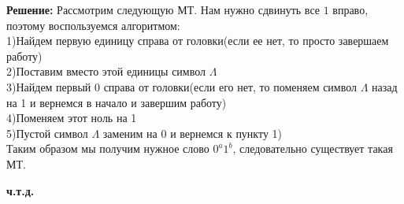 \documentclass[12pt,a4paper]{scrartcl}
\begin{document}
	\newline
	\textbf{Решение:}
	\newline
	\indent
	Рассмотрим следующую МТ. Нам нужно сдвинуть все $1$ вправо, поэтому воспользуемся алгоритмом: \\
	1)Найдем первую единицу справа от головки(если ее нет, то просто завершаем работу)\\
	2)Поставим вместо этой единицы символ $\varLambda$\\
	3)Найдем первый 0 справа от головки(если его нет, то поменяем символ $\varLambda$ назад на 1 и вернемся в начало и завершим работу)\\
	4)Поменяем этот ноль на 1\\
	5)Пустой символ $\varLambda$ заменим на 0 и вернемся к пункту 1)\\
	Таким образом мы получим нужное слово $0^a1^b$, следовательно существует такая МТ.
	\begin{flushright}
		\textbf{ч.т.д.}
	\end{flushright}
	
\end{document}
